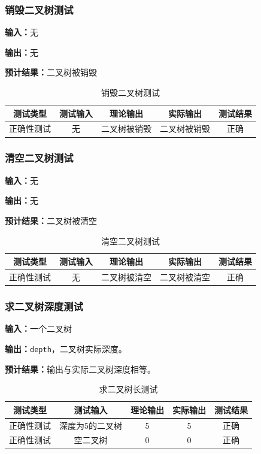 \subsubsection{销毁二叉树测试}
\textbf{输入：}无
\par
\textbf{输出：}无
\par
\textbf{预计结果：}二叉树被销毁
\begin{table}[Htb]
\caption{销毁二叉树测试}
\centering
\begin{tabular}{@{}ccccc@{}}
\toprule
\multicolumn{1}{c}{测试类型}    & \multicolumn{1}{c}{测试输入} & \multicolumn{1}{c}{理论输出} & \multicolumn{1}{c}{实际输出} & \multicolumn{1}{c}{测试结果} \\ \midrule
\multicolumn{1}{c|}{正确性测试}  & 无&二叉树被销毁&二叉树被销毁&正确\\ \bottomrule
\end{tabular}
\label{tab:destorytest3}
\end{table}


\subsubsection{清空二叉树测试}
\textbf{输入：}无
\par
\textbf{输出：}无
\par
\textbf{预计结果：}二叉树被清空
\begin{table}[Htb]
    \centering
    \caption{清空二叉树测试}
    \begin{tabular}{@{}ccccc@{}}
        \toprule
        \multicolumn{1}{c}{测试类型}    & \multicolumn{1}{c}{测试输入} & \multicolumn{1}{c}{理论输出} & \multicolumn{1}{c}{实际输出} &
        \multicolumn{1}{c}{测试结果} \\ \midrule
        \multicolumn{1}{c|}{正确性测试}  &无 &二叉树被清空&二叉树被清空&正确\\ \bottomrule
    \end{tabular}
    \label{tab:cleartest3}
\end{table}


\subsubsection{求二叉树深度测试}
\textbf{输入：}一个二叉树
\par
\textbf{输出：}\texttt{depth}，二叉树实际深度。
\par
\textbf{预计结果：}输出与实际二叉树深度相等。
\begin{table}[Htb]
    \centering
    \caption{求二叉树长测试}
    \begin{tabular}{@{}ccccc@{}}
        \toprule
        \multicolumn{1}{c}{测试类型}    & \multicolumn{1}{c}{测试输入} & \multicolumn{1}{c}{理论输出} & \multicolumn{1}{c}{实际输出} &
        \multicolumn{1}{c}{测试结果} \\ \midrule
        \multicolumn{1}{c|}{正确性测试}  & 深度为5的二叉树&5&5&正确\\
        \multicolumn{1}{c|}{正确性测试}  & 空二叉树&0&0&正确\\ \bottomrule
    \end{tabular}
    \label{tab:lengthtest3}
\end{table}


